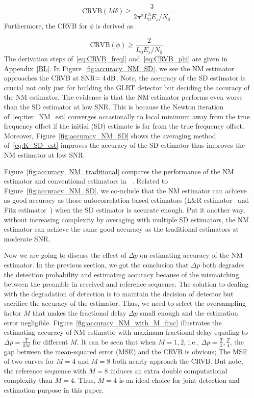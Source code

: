 \begin{equation}
    \label{eq:CRVB_freql}
    \text{CRVB}(M\delta) \geq \frac{3}{2\pi^{2}L_{0}^3E_s/N_{0}}.
  \end{equation}
Furthermore, the CRVB for $\phi$ is derived as

\begin{equation}
    \label{eq:CRVB_phi}
    \text{CRVB}(\phi) \geq \frac{2}{L_{0}E_s/N_{0}}.
  \end{equation}
The derivation steps of~\eqref{eq:CRVB_freql} and~\eqref{eq:CRVB_phi} are given in Appendix~\ref{BL}.
In Figure~\ref{fig:accuracy_NM_SD}, we see the NM estimator approaches the CRVB at SNR$=\numb{4}\dB$. 
Note, the accuracy of the SD estimator is crucial
not only just for building the GLRT detector but deciding the accuracy of the NM estimator.
The evidence is that the NM estimator performs even worse than the SD estimator at low SNR.
This is because the Newton iteration of~\eqref{eq:iter_NM_est} converges occasionally to local
minimum away from the true frequency offset if the initial (SD) estimate is far from the true frequency offset. 
Moreover, Figure~\ref{fig:accuracy_NM_SD} shows the averaging method of~\eqref{eq:K_SD_est}
improves the accuracy of the SD estimator thus improves the NM estimator at low SNR.

Figure~\ref{fig:accuracy_NM_traditional} compares the performance of the NM estimator and conventional estimators in ~\cite{Kay_89,Luise_Reggiannini_95,Fitz_94}.
Related to Figure~\ref{fig:accuracy_NM_SD}, we co-nclude that the NM estimator can achieve as good accuracy as those autocorrelation-based estimators 
(L\&R estimator~\cite{Luise_Reggiannini_95} and Fitz estimator~\cite{Fitz_94})
when the SD estimator is accurate enough. Put it another way, without increasing complexity by averaging with multiple SD estimators, 
the NM estimator can achieve the same good accuracy as the traditional estimators at moderate SNR.

Now we are going to discuss the effect of $\Delta p$ on estimating accuracy of the NM estimator.
In the previous section, we got the conclusion that $\Delta p$ both degrades the detection probability
and estimating accuracy because of the mismatching between the preamble in received and reference sequence.
The solution to dealing with the degradation of detection is to maintain the decision of detector but sacrifice the 
accuracy of the estimator. Thus, we need to select the oversampling factor $M$ that makes the fractional delay $\Delta p$ small enough and the estimation error negligible.  
Figure~\ref{fig:accuracy_NM_with_M_frac} illustrates the estimating accuracy of NM estimator with maximum fractional delay
equaling to $\Delta p{=}\frac{T}{2M}$ for different $M$. It can be seen that when $M=1,2$, i.e., $\Delta p=\frac{T}{2},\frac{T}{4}$, the gap between
the mean-squared error (MSE) and the CRVB is obvious; The MSE of two curves for $M=4$ and $M=8$ both nearly approach the
CRVB. But note, the reference sequence with $M=8$ induces an extra double computational complexity than $M=4$. Thus, $M=4$ is an ideal choice
for joint detection and estimation purpose in this paper.

